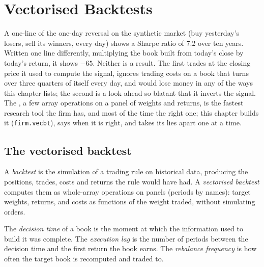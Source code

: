 \chapter{Vectorised Backtests}\label{ch:rs:vectorised-backtests}

A one-line  of the one-day reversal on the synthetic market (buy yesterday's losers, sell its winners, every day) shows a Sharpe
ratio of 7.2 over ten years. Written one line differently, multiplying the book built from today's close by today's return, it shows
$-65$. Neither is a result. The first trades at the closing price it used to compute the signal, ignores trading costs on a book that
turns over three quarters of itself every day, and would lose money in any of the ways this chapter lists; the second is a look-ahead so
blatant that it inverts the signal. The , a few array operations on a panel of weights and returns, is the fastest
research tool the firm has, and most of the time the right one; this chapter builds it (\texttt{firm.vecbt}), says when it is right, and
takes its lies apart one at a time.

\section{The vectorised backtest}

\begin{definition}\label{def:rs:vectorised-backtests:backtest}
A \emph{backtest} is the simulation of a trading rule on historical data, producing the positions, trades, costs and
returns the rule would have had. A \emph{vectorised backtest} computes them as whole-array operations on panels
(periods by names): target weights, returns, and costs as functions of the weight traded, without simulating orders.
\end{definition}

\begin{definition}\label{def:rs:vectorised-backtests:timing}
The \emph{decision time} of a book is the moment at which the information used to build it was complete. The
\emph{execution lag} is the number of periods between the decision time and the first return the book earns. The
\emph{rebalance frequency} is how often the target book is recomputed and traded to.
\end{definition}

